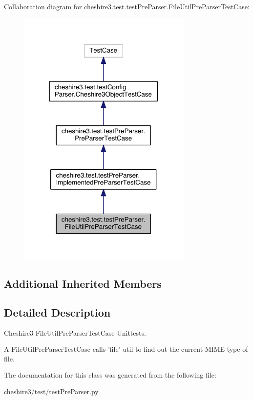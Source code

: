 Collaboration diagram for cheshire3.\-test.\-test\-Pre\-Parser.\-File\-Util\-Pre\-Parser\-Test\-Case\-:
\nopagebreak
\begin{figure}[H]
\begin{center}
\leavevmode
\includegraphics[width=246pt]{classcheshire3_1_1test_1_1test_pre_parser_1_1_file_util_pre_parser_test_case__coll__graph}
\end{center}
\end{figure}
\subsection*{Additional Inherited Members}


\subsection{Detailed Description}
\begin{DoxyVerb}Cheshire3 FileUtilPreParserTestCase Unittests.

A FileUtilPreParserTestCase calls 'file' util to find out the current MIME
type of file.
\end{DoxyVerb}
 

The documentation for this class was generated from the following file\-:\begin{DoxyCompactItemize}
\item 
cheshire3/test/test\-Pre\-Parser.\-py\end{DoxyCompactItemize}
